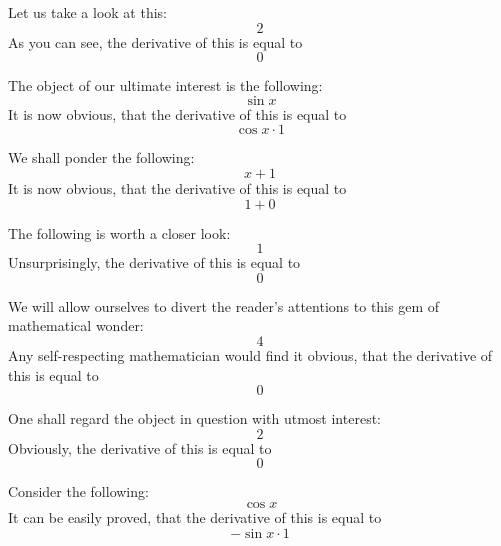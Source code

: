 \documentclass{article}
\begin{document}
Let us take a look at this:
\begin{equation}
2 
\end{equation}
As you can see, the derivative of this is equal to
\begin{equation}
0 
\end{equation}

The object of our ultimate interest is the following:
\begin{equation}
\sin x 
\end{equation}
It is now obvious, that the derivative of this is equal to
\begin{equation}
\cos x \cdot 1 
\end{equation}

We shall ponder the following:
\begin{equation}
x + 1 
\end{equation}
It is now obvious, that the derivative of this is equal to
\begin{equation}
1 + 0 
\end{equation}

The following is worth a closer look:
\begin{equation}
1 
\end{equation}
Unsurprisingly, the derivative of this is equal to
\begin{equation}
0 
\end{equation}

We will allow ourselves to divert the reader's attentions to this gem of mathematical wonder:
\begin{equation}
4 
\end{equation}
Any self-respecting mathematician would find it obvious, that the derivative of this is equal to
\begin{equation}
0 
\end{equation}

One shall regard the object in question with utmost interest:
\begin{equation}
2 
\end{equation}
Obviously, the derivative of this is equal to
\begin{equation}
0 
\end{equation}

Consider the following:
\begin{equation}
\cos x 
\end{equation}
It can be easily proved, that the derivative of this is equal to
\begin{equation}
-\sin x \cdot 1 
\end{equation}
\end{document}
